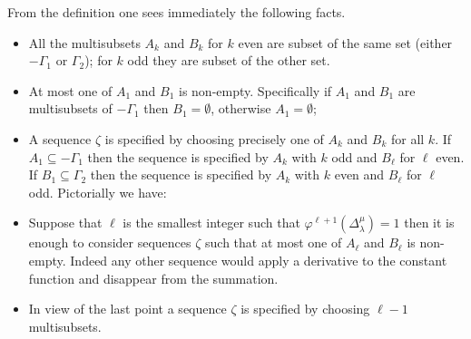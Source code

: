 \documentclass[a4paper]{amsart}
\theoremstyle{definition}
\begin{document}
From the definition one sees immediately the following facts.
\begin{itemize}
  \item
    All the multisubsets $A_k$ and $B_k$ for $k$ even are subset of the same set (either $-\Gamma_1$ or $\Gamma_2$); for $k$ odd they are subset of the other set.

  \item
    At most one of $A_1$ and $B_1$ is non-empty. 
    Specifically if $A_1$ and $B_1$ are multisubsets of $-\Gamma_1$ then $B_1 = \emptyset$, otherwise $A_1 = \emptyset$;

  \item
    A sequence $\zeta$ is specified by choosing precisely one of $A_k$ and $B_k$ for all $k$.
    If $A_1\subseteq -\Gamma_1$ then the sequence is specified by $A_k$ with $k$ odd and $B_\ell$ for $\ell$ even.
    If $B_1\subseteq \Gamma_2$ then the sequence is specified by $A_k$ with $k$ even and $B_\ell$ for $\ell$ odd.
    Pictorially we have:
    \begin{center}
    \end{center}

  \item
    Suppose that $\ell$ is the smallest integer such that $\varphi^{\ell+1}(\Delta_\lambda^\mu)=1$ then it is enough to consider sequences $\zeta$ such that at most one of $A_\ell$ and $B_\ell$ is non-empty.
    Indeed any other sequence would apply a derivative to the constant function and disappear from the summation.

  \item
    In view of the last point a sequence $\zeta$ is specified by choosing $\ell-1$ multisubsets.
\end{itemize}
\end{document}
